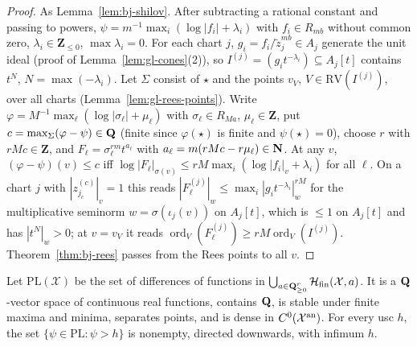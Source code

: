 \begin{proof}
As Lemma~\ref{lem:bj-shilov}. After subtracting a rational constant and passing to powers, $\psi=m^{-1}\max_i(\log|f_i|+\lambda_i)$ with
$f_i\in R_{mb}$ without common zero, $\lambda_i\in\mathbf Z_{\le0}$, $\max\lambda_i=0$. For each chart $j$, $g_i=f_i/\tilde z_j^{mb}\in A_j$ generate the unit
ideal (proof of Lemma~\ref{lem:gl-cones}(2)), so $I^{(j)}=(g_it^{-\lambda_i})\subseteq A_j[t]$ contains $t^N$, $N=\max(-\lambda_i)$. Let $\Sigma$ consist of $\star$
and the points $v_V$, $V\in\mathrm{RV}(I^{(j)})$, over all charts (Lemma~\ref{lem:gl-rees-points}). Write $\varphi=M^{-1}\max_\ell(\log|\sigma_\ell|+\mu_\ell)$ with
$\sigma_\ell\in R_{Ma}$, $\mu_\ell\in\mathbf Z$, put $c=\max_\Sigma(\varphi-\psi)\in\mathbf{Q}$ (finite since $\varphi(\star)$ is finite and $\psi(\star)=0$), choose $r$ with
$rMc\in\mathbf Z$, and $F_\ell=\sigma_\ell^{rm}t^{a_\ell}$ with $a_\ell=m(rMc-r\mu_\ell)\in\mathbf{N}$. At any $v$, $(\varphi-\psi)(v)\le c$ iff
$\log|F_\ell|_{\sigma(v)}\le rM\max_i(\log|f_i|_v+\lambda_i)$ for all $\ell$. On a chart $j$ with $|z^{(c)}_{j_c}|_v=1$ this reads
$|F^{(j)}_\ell|_w\le\max_i|g_it^{-\lambda_i}|_w^{rM}$ for the multiplicative seminorm $w=\sigma(\iota_j(v))$ on $A_j[t]$, which is $\le1$ on $A_j[t]$ and has
$|t^N|_w>0$; at $v=v_V$ it reads $\operatorname{ord}_V(F^{(j)}_\ell)\ge rM\operatorname{ord}_V(I^{(j)})$. Theorem~\ref{thm:bj-rees} passes from the Rees points to all $v$.
\end{proof}

\begin{lemma}\label{lem:gl-pl}
\leanok
{}
Let $\mathrm{PL}(\mathcal X)$ be the set of differences of functions in $\bigcup_{a\in\mathbf{Q}^r_{\ge0}}\mathcal H_{\mathrm{fin}}(\mathcal X,a)$. It is a $\mathbf{Q}$-vector space
of continuous real functions, contains $\mathbf{Q}$, is stable under finite maxima and minima, separates points, and is dense in $C^0(\mathcal X^{\mathrm{an}})$. For every usc
$h$, the set $\{\psi\in\mathrm{PL}:\psi>h\}$ is nonempty, directed downwards, with infimum $h$.
\end{lemma}

